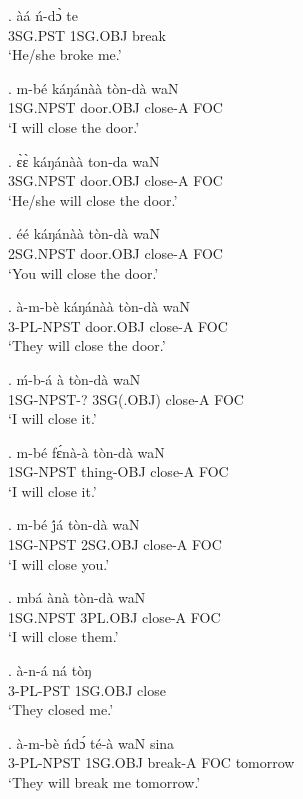 \documentclass{assets/fieldnotes}
\begin{document}
\exg.
àá        ń-dɔ̀       te    \\
3SG.PST   1SG.OBJ   break \\%
`He/she broke me.'

\exg.
m-bé        káŋánàà    tòn-dà    waN \\
1SG.NPST   door.OBJ   close-A   FOC \\%
`I will close the door.'

\exg.
ɛ̀ɛ̀         káŋánàà    ton-da    waN \\
3SG.NPST   door.OBJ   close-A   FOC \\%
`He/she will close the door.' \label{16309}


\exg.
éé         káŋánàà    tòn-dà    waN \\
2SG.NPST   door.OBJ   close-A   FOC \\%
`You will close the door.'

\exg.
à-m-bè       káŋánàà    tòn-dà    waN \\
3-PL-NPST   door.OBJ   close-A   FOC \\%
`They will close the door.'

\exg.
ḿ-b-á        à           tòn-dà    waN \\
1SG-NPST-?   3SG(.OBJ)   close-A   FOC \\%
`I will close it.'

\exg.
m-bé        fɛ́nà-à      tòn-dà    waN \\
1SG-NPST   thing-OBJ   close-A   FOC \\%
`I will close it.'

\exg.
m-bé        j́á        tòn-dà    waN \\
1SG-NPST   2SG.OBJ   close-A   FOC \\%
`I will close you.'

\exg.
mbá        ànà       tòn-dà    waN \\
1SG.NPST   3PL.OBJ   close-A   FOC \\%
`I will close them.'

\exg.
à-n-á       ná        tòŋ   \\
3-PL-PST   1SG.OBJ   close \\%
`They closed me.'

\exg.
à-m-bè       ńdɔ́       té-à      waN   sina     \\
3-PL-NPST   1SG.OBJ   break-A   FOC   tomorrow \\%
`They will break me tomorrow.'
\end{document}
